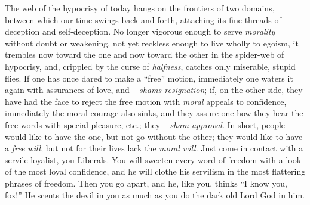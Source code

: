 The web of the hypocrisy of today hangs on the frontiers of two domains, 
between which our time swings back and forth, attaching its fine threads of 
deception and self-deception. No longer vigorous enough to serve 
\textit{morality} without doubt or weakening, not yet reckless enough to live 
wholly to egoism, it trembles now toward the one and now toward the other in 
the spider-web of hypocrisy, and, crippled by the curse of \textit{halfness}, 
catches only miserable, stupid flies. If one has once dared to make a 
``free'' motion, immediately one waters it again with assurances of love, 
and -- \textit{shams resignation}; if, on the other side, they have had the 
face to reject the free motion with \textit{moral} appeals to confidence, 
immediately the moral courage also sinks, and they assure one how they hear 
the free words with special pleasure, etc.; they -- \textit{sham approval}. In 
short, people would like to have the one, but not go without the other; they 
would like to have a \textit{free will}, but not for their lives lack the 
\textit{moral will}. Just come in contact with a servile loyalist, you 
Liberals. You will sweeten every word of freedom with a look of the most loyal 
confidence, and he will clothe his servilism in the most flattering phrases of 
freedom. Then you go apart, and he, like you, thinks ``I know you, fox!'' He 
scents the devil in you as much as you do the dark old Lord God in him.

